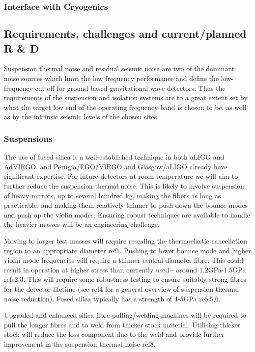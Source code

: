\subsubsection{Interface with Cryogenics}



\subsection{Requirements, challenges and current/planned R \& D}

Suspension thermal noise and residual seismic noise are two of the dominant noise sources which limit the low frequency performance and define the low-frequency cut-off for ground based gravitational wave detectors. Thus the requirements of the suspension and isolation systems are to a great extent set by what the target low end of the operating frequency band is chosen to be, as well as by the intrinsic seismic levels of the chosen sites.

\subsubsection{Suspensions}

The use of fused silica is a well-established technique in both aLIGO and AdVIRGO,  and Perugia/EGO/VIRGO and Glasgow/aLIGO already have significant expertise. For future detectors at room temperature  we will aim to further reduce the suspension thermal noise. This is likely to involve suspension of heavy mirrors, up to several hundred kg, making the fibers as long as practicable, and making them relatively thinner to push down the bounce modes and push up the violin modes.  Ensuring robust techniques are available to handle the heavier masses will be an engineering challenge.
 
Moving to larger test masses will require rescaling the thermoelastic cancellation region to an appropriate diameter ref1. Pushing to lower bounce mode and higher violin mode frequencies will require a thinner central diameter fibre. This could result in operation at higher stress than currently used - around 1.2GPa-1.5GPa refs2,3. This will require some robustness testing to ensure suitably strong fibres for the detector lifetime (see ref4 for a general overview of suspension thermal noise reduction). Fused silica typically has a strength of 4-5GPa refs5,6.

Upgraded and enhanced silica fibre pulling/welding machines will be required to  pull the longer fibres and to weld from thicker stock material. Utilising thicker stock will reduce the loss component due to the weld and provide further improvement in the suspension thermal noise ref8. 

